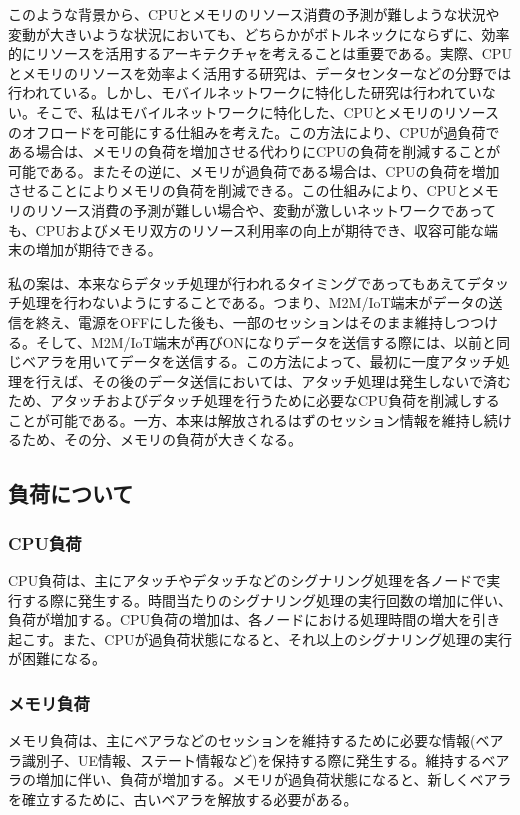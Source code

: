 \documentclass[a4j]{ujarticle}
\begin{document}
このような背景から、CPUとメモリのリソース消費の予測が難しような状況や変動が大きいような状況においても、どちらかがボトルネックにならずに、効率的にリソースを活用するアーキテクチャを考えることは重要である。実際、CPUとメモリのリソースを効率よく活用する研究は、データセンターなどの分野では行われている。しかし、モバイルネットワークに特化した研究は行われていない。そこで、私はモバイルネットワークに特化した、CPUとメモリのリソースのオフロードを可能にする仕組みを考えた。この方法により、CPUが過負荷である場合は、メモリの負荷を増加させる代わりにCPUの負荷を削減することが可能である。またその逆に、メモリが過負荷である場合は、CPUの負荷を増加させることによりメモリの負荷を削減できる。この仕組みにより、CPUとメモリのリソース消費の予測が難しい場合や、変動が激しいネットワークであっても、CPUおよびメモリ双方のリソース利用率の向上が期待でき、収容可能な端末の増加が期待できる。

私の案は、本来ならデタッチ処理が行われるタイミングであってもあえてデタッチ処理を行わないようにすることである。つまり、M2M/IoT端末がデータの送信を終え、電源をOFFにした後も、一部のセッションはそのまま維持しつつける。そして、M2M/IoT端末が再びONになりデータを送信する際には、以前と同じベアラを用いてデータを送信する。この方法によって、最初に一度アタッチ処理を行えば、その後のデータ送信においては、アタッチ処理は発生しないで済むため、アタッチおよびデタッチ処理を行うために必要なCPU負荷を削減しすることが可能である。一方、本来は解放されるはずのセッション情報を維持し続けるため、その分、メモリの負荷が大きくなる。

\subsection{負荷について}
\subsubsection{CPU負荷}
CPU負荷は、主にアタッチやデタッチなどのシグナリング処理を各ノードで実行する際に発生する。時間当たりのシグナリング処理の実行回数の増加に伴い、負荷が増加する。CPU負荷の増加は、各ノードにおける処理時間の増大を引き起こす。また、CPUが過負荷状態になると、それ以上のシグナリング処理の実行が困難になる。
\subsubsection{メモリ負荷}
メモリ負荷は、主にベアラなどのセッションを維持するために必要な情報(ベアラ識別子、UE情報、ステート情報など)を保持する際に発生する。維持するベアラの増加に伴い、負荷が増加する。メモリが過負荷状態になると、新しくベアラを確立するために、古いベアラを解放する必要がある。
\end{document}
